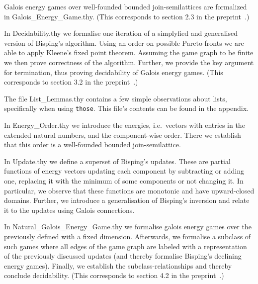 Galois energy games over well-founded bounded join-semilattices are formalized in Galois\_Energy\_Game.thy. 
(This corresponds to section 2.3 in the preprint~\cite{preprint}.)

In Decidability.thy we formalise one iteration of a simplyfied and generalised version of Bisping's algorithm. 
Using an order on possible Pareto fronts we are able to apply Kleene's fixed point theorem. 
Assuming the game graph to be finite we then prove correctness of the algorithm. Further, we provide the key argument for termination, thus proving decidability of Galois energy games.
(This corresponds to section 3.2 in the preprint~\cite{preprint}.)

The file List\_Lemmas.thy contains a few simple observations about lists, specifically when using \texttt{those}. This file's contents can be found in the appendix.

In Energy\_Order.thy we introduce the energies, i.e.\ vectors with entries in the extended natural numbers, and the component-wise order. There we establish that this order is a well-founded bounded join-semilattice. 

In Update.thy we define a superset of Bisping's updates. These are partial functions of energy vectors updating each component by subtracting or adding one, replacing it with the minimum of some components or not changing it. In particular, we observe that these functions are monotonic and have upward-closed domains.
Further, we introduce a generalisation of Bisping's inversion and relate it to the updates using Galois connections. 

In Natural\_Galois\_Energy\_Game.thy we formalise galois energy games over the previously defined with a fixed dimension. 
Afterwards, we formalise a subclass of such games where all edges of the game graph are labeled with a representation of the previously discussed updates (and thereby formalise Bisping's declining energy games).
Finally, we establish the subclass-relationships and thereby conclude decidability. 
(This corresponds to section 4.2 in the preprint~\cite{preprint}.)
